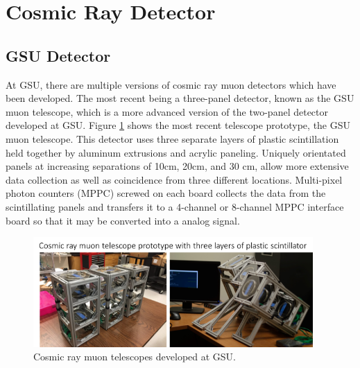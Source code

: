 \section{Cosmic Ray Detector}

\subsection{GSU Detector}

At GSU, there are multiple versions of cosmic ray muon detectors which have been developed. The most recent being a three-panel detector, known as the GSU muon telescope, which is a more advanced version of the two-panel detector developed at GSU.  Figure \ref{muonTelescope} shows the most recent telescope prototype, the GSU muon telescope. This detector uses three separate layers of plastic scintillation %
held together by aluminum extrusions and acrylic paneling. Uniquely orientated panels at increasing separations of 10cm, 20cm, and 30 cm, allow more extensive data collection as well as coincidence from three different locations. Multi-pixel photon counters (MPPC) screwed on each board collects the data from the scintillating panels and transfers it to a 4-channel or 8-channel MPPC interface board so that it may be converted into a analog signal.
\begin{figure}[htb]
\centering
\includegraphics[width=0.95\textwidth]{images/muonTelescope1.png} 
\caption{Cosmic ray muon telescopes developed at GSU.}
\label{muonTelescope}
\end{figure}

%
%
%
